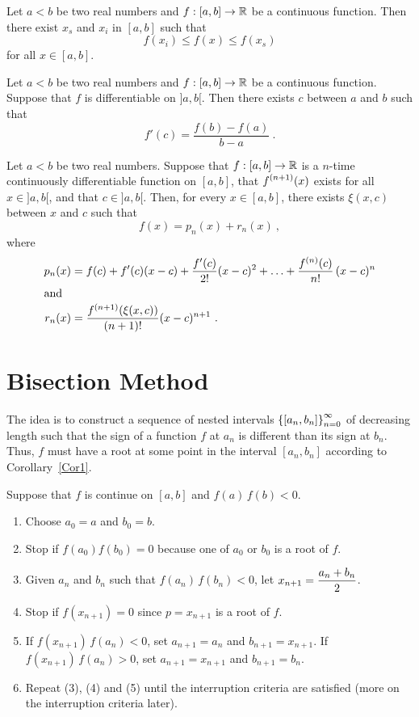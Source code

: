 \begin{theorem}
Let $a<b$ be two real numbers and $f:[a,b] \rightarrow \mathbb{R}$ be a
continuous function.  Then there exist $x_s$ and $x_i$ in $[a,b]$ such
that
\[
f(x_i) \leq f(x) \leq f(x_s)
\]
for all $x \in [a,b]$.
\label{Th2}
\end{theorem}

\begin{theorem} \label{Th3}
Let $a<b$ be two real numbers and $f:[a,b] \rightarrow \mathbb{R}$ be a
continuous function.  Suppose that $f$ is differentiable on $]a,b[$.
Then there exists $c$ between $a$ and $b$ such that
\[
f'(c)=\frac{f(b)-f(a)}{b-a} \ .
\]
\end{theorem}

\begin{theorem}
Let $a<b$ be two real numbers.  Suppose that $f:[a,b] \rightarrow \mathbb{R}$
is a $n$-time continuously differentiable function on $[a,b]$, that
$\displaystyle f^{(n+1)}(x)$ exists for all $x \in ]a,b[$, and that
$c \in ]a,b[$.  Then, for every $x \in [a,b]$, there exists $\xi(x,c)$
between $x$ and $c$ such that
\[
f(x) = p_n(x) + r_n(x) \ ,
\]
where
\begin{align*}
p_n(x) &= f(c) + f'(c)(x-c) + \frac{f'(c)}{2!}(x-c)^2 + \ldots
+ \frac{f^{(n)}(c)}{n!} \, (x-c)^n\\
\intertext{and}
r_n(x) &= \frac{f^{(n+1)}(\xi(x,c))}{(n+1)!}(x-c)^{n+1} \ .
\end{align*}
\label{TaylorTheo}
\end{theorem}

\section{Bisection Method}

The idea is to construct a sequence of nested intervals
$\displaystyle \left\{ [a_n,b_n] \right\}_{n=0}^\infty$ of decreasing
length such that the sign of a function $f$ at $a_n$ is different than
its sign at $b_n$.  Thus, $f$ must have a root at some point in the
interval $[a_n,b_n]$ according to Corollary~\ref{Cor1}.

\begin{algo}[Bisection]
Suppose that $f$ is continue on $[a,b]$ and $f(a)\,f(b)<0$.
\begin{enumerate}
\item Choose $a_0=a$ and $b_0=b$.
\item Stop if $f(a_0)f(b_0) = 0$ because one of $a_0$ or $b_0$ is a
root of $f$. \label{BisectAlgo2}
\item Given $a_n$ and $b_n$ such that $f(a_n)\,f(b_n)<0$,
let $\displaystyle x_{n+1}=\frac{a_n+b_n}{2}$.
\item Stop if $f(x_{n+1})=0$ since $p=x_{n+1}$ is a root of $f$.
\label{BisectAlgo4}
\item If $f(x_{n+1})\,f(a_n) < 0$, set $a_{n+1}=a_n$ and
$b_{n+1}=x_{n+1}$.  If $f(x_{n+1})\,f(a_n) > 0$, set $a_{n+1}=x_{n+1}$
and $b_{n+1}=b_n$.
\item Repeat (3), (4) and (5) until the interruption criteria are satisfied
(more on the interruption criteria later).
\end{enumerate}
\label{BisectAlgo}
\end{algo}

